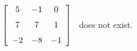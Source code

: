 {$\left[ \begin {array}{ccc} 5&-1&0\\\noalign{\medskip}7&7&1
\\\noalign{\medskip}-2&-8&-1\end {array} \right]$ 
}
{\ttai\ does not exist.}
